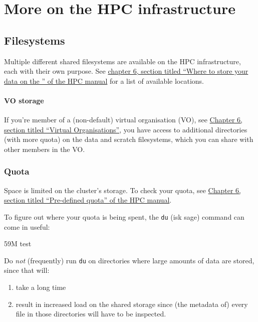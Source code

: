\chapter{More on the HPC infrastructure}

\section{Filesystems}

Multiple different shared filesystems are available on the HPC infrastructure,
each with their own purpose. See \href{\HPCManualURL#predefined-user-directories}{chapter 6, section titled ``Where to store your data on the \hpc{}'' of the HPC manual}
for a list of available locations.

\ifgent

\subsubsection{VO storage}

If you're member of a (non-default) virtual organisation (VO), see
\href{\HPCManualURL#sec:virtual-organisation}{Chapter 6, section titled ``Virtual Organisations''}, you have access to
additional directories (with more quota) on the data and \gls{scratch} filesystems,
which you can share with other members in the VO.

\fi

\subsection{Quota}

Space is limited on the cluster's storage. To check your quota, see
\href{\HPCManualURL#predefined-quotas}{Chapter 6, section titled ``Pre-defined quota'' of the HPC manual}.

To figure out where your quota is being spent, the \lstinline|du| (isk sage)
command can come in useful:

\begin{prompt}
59M   test
\end{prompt}

Do \emph{not} (frequently) run \lstinline|du| on directories where large amounts
of data are stored, since that will:
\begin{enumerate}
    \item take a long time
    \item result in increased
        load on the shared storage since (the metadata of) every file in those directories
        will have to be inspected.
\end{enumerate}

